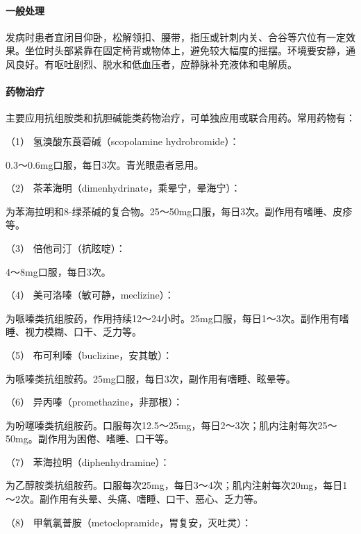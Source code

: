 \paragraph{一般处理}

发病时患者宜闭目仰卧，松解领扣、腰带，指压或针刺内关、合谷等穴位有一定效果。坐位时头部紧靠在固定椅背或物体上，避免较大幅度的摇摆。环境要安静，通风良好。有呕吐剧烈、脱水和低血压者，应静脉补充液体和电解质。

\paragraph{药物治疗}

主要应用抗组胺类和抗胆碱能类药物治疗，可单独应用或联合用药。常用药物有：

\hypertarget{text00356.htmlux5cux23CHP15-2-3-2-1}{}
（1） 氢溴酸东莨菪碱（scopolamine hydrobromide）：

0.3～0.6mg口服，每日3次。青光眼患者忌用。

\hypertarget{text00356.htmlux5cux23CHP15-2-3-2-2}{}
（2） 茶苯海明（dimenhydrinate，乘晕宁，晕海宁）：

为苯海拉明和8-绿茶碱的复合物。25～50mg口服，每日3次。副作用有嗜睡、皮疹等。

\hypertarget{text00356.htmlux5cux23CHP15-2-3-2-3}{}
（3） 倍他司汀（抗眩啶）：

4～8mg口服，每日3次。

\hypertarget{text00356.htmlux5cux23CHP15-2-3-2-4}{}
（4） 美可洛嗪（敏可静，meclizine）：

为哌嗪类抗组胺药，作用持续12～24小时。25mg口服，每日1～3次。副作用有嗜睡、视力模糊、口干、乏力等。

\hypertarget{text00356.htmlux5cux23CHP15-2-3-2-5}{}
（5） 布可利嗪（buclizine，安其敏）：

为哌嗪类抗组胺药。25mg口服，每日3次，副作用有嗜睡、眩晕等。

\hypertarget{text00356.htmlux5cux23CHP15-2-3-2-6}{}
（6） 异丙嗪（promethazine，非那根）：

为吩噻嗪类抗组胺药。口服每次12.5～25mg，每日2～3次；肌内注射每次25～50mg。副作用为困倦、嗜睡、口干等。

\hypertarget{text00356.htmlux5cux23CHP15-2-3-2-7}{}
（7） 苯海拉明（diphenhydramine）：

为乙醇胺类抗组胺药。口服每次25mg，每日3～4次；肌内注射每次20mg，每日1～2次。副作用有头晕、头痛、嗜睡、口干、恶心、乏力等。

\hypertarget{text00356.htmlux5cux23CHP15-2-3-2-8}{}
（8） 甲氧氯普胺（metoclopramide，胃复安，灭吐灵）：

